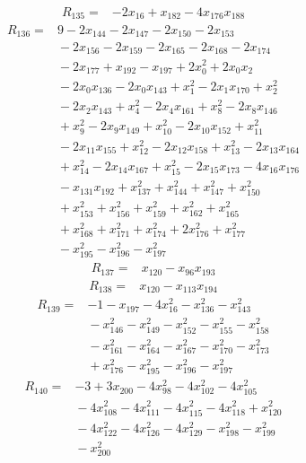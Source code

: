 \begin{align*}
R_{135} ={}& -2x_{16} + x_{182} - 4x_{176} x_{188}
\end{align*}
\begin{align*}
R_{136} ={}& 9 - 2x_{144} - 2x_{147} - 2x_{150} - 2x_{153} \\
&{} -2x_{156} - 2x_{159} - 2x_{165} - 2x_{168} - 2x_{174} \\
&{} -2x_{177} + x_{192} - x_{197} + 2x_{0}^{2} + 2x_{0} x_{2} \\
&{} -2x_{0} x_{136} - 2x_{0} x_{143} + x_{1}^{2} - 2x_{1} x_{170} + x_{2}^{2} \\
&{} -2x_{2} x_{143} + x_{4}^{2} - 2x_{4} x_{161} + x_{8}^{2} - 2x_{8} x_{146} \\
&{} + x_{9}^{2} - 2x_{9} x_{149} + x_{10}^{2} - 2x_{10} x_{152} + x_{11}^{2} \\
&{} -2x_{11} x_{155} + x_{12}^{2} - 2x_{12} x_{158} + x_{13}^{2} - 2x_{13} x_{164} \\
&{} + x_{14}^{2} - 2x_{14} x_{167} + x_{15}^{2} - 2x_{15} x_{173} - 4x_{16} x_{176} \\
&{} -x_{131} x_{192} + x_{137}^{2} + x_{144}^{2} + x_{147}^{2} + x_{150}^{2} \\
&{} + x_{153}^{2} + x_{156}^{2} + x_{159}^{2} + x_{162}^{2} + x_{165}^{2} \\
&{} + x_{168}^{2} + x_{171}^{2} + x_{174}^{2} + 2x_{176}^{2} + x_{177}^{2} \\
&{} -x_{195}^{2} - x_{196}^{2} - x_{197}^{2}
\end{align*}
\begin{align*}
R_{137} ={}& x_{120} - x_{96} x_{193}
\end{align*}
\begin{align*}
R_{138} ={}& x_{120} - x_{113} x_{194}
\end{align*}
\begin{align*}
R_{139} ={}& -1 - x_{197} - 4x_{16}^{2} - x_{136}^{2} - x_{143}^{2} \\
&{} -x_{146}^{2} - x_{149}^{2} - x_{152}^{2} - x_{155}^{2} - x_{158}^{2} \\
&{} -x_{161}^{2} - x_{164}^{2} - x_{167}^{2} - x_{170}^{2} - x_{173}^{2} \\
&{} + x_{176}^{2} - x_{195}^{2} - x_{196}^{2} - x_{197}^{2}
\end{align*}
\begin{align*}
R_{140} ={}& -3 + 3x_{200} - 4x_{98}^{2} - 4x_{102}^{2} - 4x_{105}^{2} \\
&{} -4x_{108}^{2} - 4x_{111}^{2} - 4x_{115}^{2} - 4x_{118}^{2} + x_{120}^{2} \\
&{} -4x_{122}^{2} - 4x_{126}^{2} - 4x_{129}^{2} - x_{198}^{2} - x_{199}^{2} \\
&{} -x_{200}^{2}
\end{align*}
